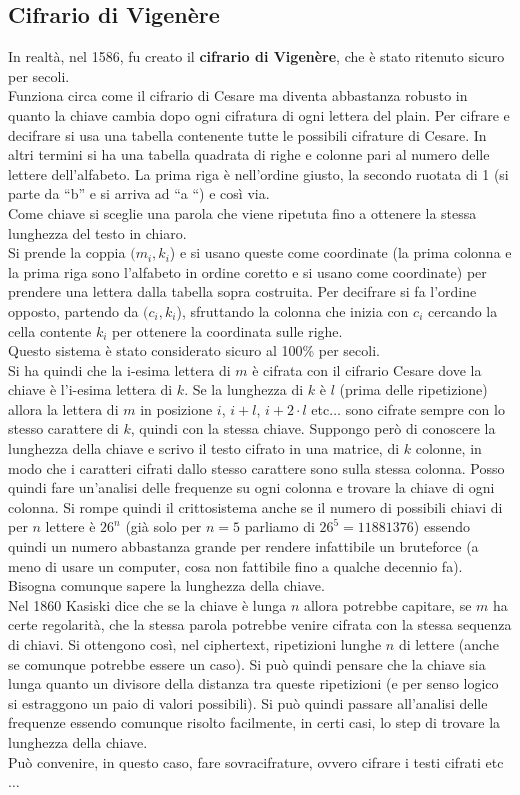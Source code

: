 \documentclass[a4paper,12pt, oneside]{book}
\begin{document}
\subsection{Cifrario di Vigenère}
In realtà, nel 1586, fu creato il \textbf{cifrario di Vigenère}, che è stato
ritenuto sicuro per secoli.\\
Funziona circa come il cifrario di Cesare ma diventa abbastanza robusto in
quanto la chiave cambia dopo ogni cifratura di ogni lettera del plain. Per
cifrare e decifrare si usa una tabella contenente tutte le possibili cifrature
di Cesare. In altri termini si ha una tabella quadrata di righe e colonne pari
al numero delle lettere dell'alfabeto. La prima riga è nell'ordine giusto, la
secondo ruotata di 1 (si parte da ``b'' e si arriva ad ``a ``) e così via.\\
Come chiave si sceglie una parola che viene ripetuta fino a ottenere la stessa
lunghezza del testo in chiaro.\\
Si prende la coppia $(m_i,k_i$) e si usano queste come coordinate (la prima
colonna e la prima riga sono l'alfabeto in ordine coretto e si usano come
coordinate) per prendere una lettera dalla tabella sopra costruita. Per
decifrare si fa l'ordine opposto, partendo da $(c_i, k_i$), sfruttando la
colonna che inizia con $c_i$ cercando la cella contente $k_i$ per ottenere la
coordinata sulle righe.\\
Questo sistema è stato considerato sicuro al 100\% per secoli.\\
Si ha quindi che la i-esima lettera di $m$ è cifrata con il cifrario Cesare dove
la chiave è l'i-esima lettera di $k$.
Se la lunghezza di $k$ è $l$ (prima delle ripetizione) allora la lettera di $m$
in posizione $i$, $i+l$, $i+2\cdot l$ etc$\ldots$ sono cifrate sempre con lo
stesso carattere di $k$, quindi con la stessa chiave. Suppongo però di conoscere
la lunghezza della chiave e scrivo il testo cifrato in una matrice, di $k$
colonne, in modo che i caratteri cifrati dallo stesso carattere sono sulla
stessa colonna. Posso quindi fare un'analisi delle frequenze su ogni colonna e
trovare la chiave di ogni colonna. Si rompe quindi il crittosistema anche se il
numero di possibili chiavi di per $n$ lettere è $26^n$ (già solo per $n=5$
parliamo di $26^5=11881376$) essendo quindi un numero abbastanza grande per
rendere infattibile un bruteforce (a meno di usare un computer, cosa non
fattibile fino a qualche decennio fa). Bisogna comunque sapere la lunghezza
della chiave.\\
Nel 1860 Kasiski dice che se la chiave è lunga $n$ allora potrebbe capitare, se
$m$ ha certe regolarità, che la stessa parola potrebbe venire cifrata con la
stessa sequenza di chiavi. Si ottengono così, nel ciphertext, ripetizioni
lunghe $n$ di lettere (anche se comunque potrebbe essere un caso). Si può quindi
pensare che la chiave sia lunga quanto un divisore della distanza tra queste
ripetizioni (e per senso logico si estraggono un paio di valori possibili). Si
può quindi passare all'analisi delle frequenze essendo comunque risolto
facilmente, in certi casi, lo step di trovare la lunghezza della chiave.\\
Può convenire, in questo caso, fare sovracifrature, ovvero cifrare i testi
cifrati etc$\ldots$ 
\end{document}
